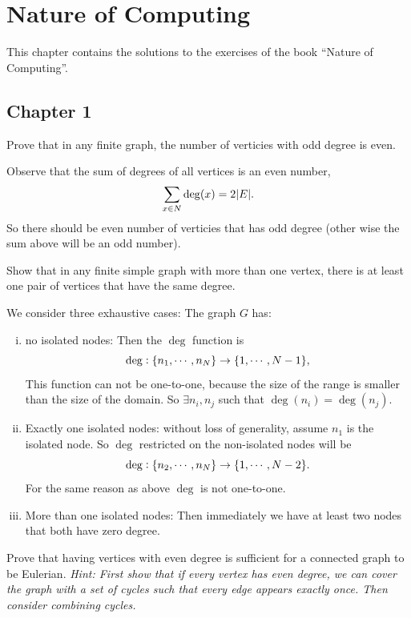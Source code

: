 \chapter{Nature of Computing}
This chapter contains the solutions to the exercises of the book ``Nature of Computing''.


\section{Chapter 1}

\begin{problem}
	Prove that in any finite graph, the number of verticies with odd degree is even.
\end{problem}
\begin{solution}
	Observe that the sum of degrees of all vertices is an even number,
	\[ \sum_{x\in N} \deg(x) = 2|E|. \]
	So there should be even number of verticies that has odd degree (other wise the sum above will be an odd number).
\end{solution}

\begin{problem}
	Show that in any finite simple graph with more than one vertex, there is at least one pair of vertices that have the same degree.
\end{problem}
\begin{solution}
	We consider three exhaustive cases: The graph $ G $ has:
	\begin{enumerate}[(i)]
		\item no isolated nodes: Then the $ \deg $ function is
		\[ \deg: \{n_1,\cdots,n_N\} \to \{1,\cdots,N-1\}, \]
		This function can not be one-to-one, because the size of the range is smaller than the size of the domain. So $ \exists n_i,n_j $ such that $ \deg(n_i) = \deg(n_j) $.
		\item Exactly one isolated nodes: without loss of generality, assume $ n_1 $ is the isolated node. So $ \deg $ restricted on the non-isolated nodes will be
		\[ \deg: \{n_2,\cdots,n_N\} \to \{1,\cdots,N-2\}. \]
		For the same reason as above $ \deg $ is not one-to-one.
		
		\item More than one isolated nodes: Then immediately we have at least two nodes that both have zero degree.
	\end{enumerate}
\end{solution}

\begin{problem}
	Prove that having vertices with even degree is sufficient for a connected graph to be Eulerian. \emph{Hint: First show that if every vertex has even degree, we can cover the graph with a set of cycles such that every edge appears exactly once. Then consider combining cycles.}
\end{problem}

